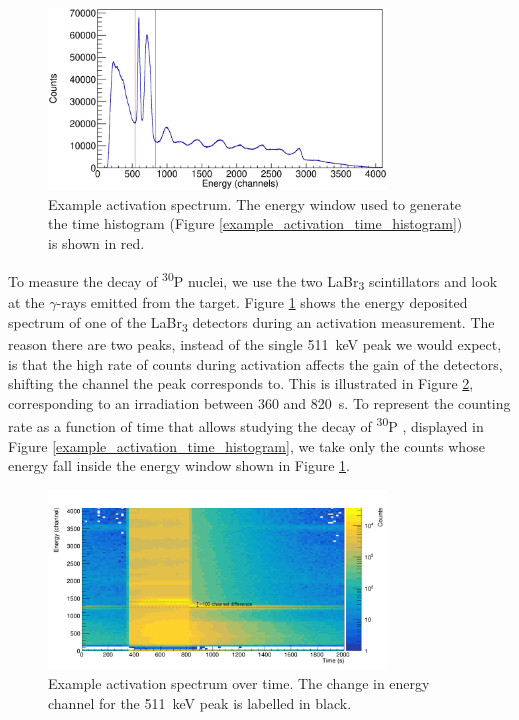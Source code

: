 \documentclass[a4paper,12pt]{report}
\newcommand{\Piso}{\textsuperscript{30}P }
\begin{document}
\begin{figure}[H]
	\centering
	\includegraphics[width=0.80\textwidth]{example_activation_energy_histogram.eps}
	\caption{Example activation spectrum.
	The energy window used to generate the time histogram (Figure \ref{example_activation_time_histogram}) is shown in red.}	%
	\label{example_activation_energy_histogram}
\end{figure}

To measure the decay of \Piso nuclei, we use the two LaBr\textsubscript{3} scintillators and look at the $\gamma$-rays emitted from the target.
Figure \ref{example_activation_energy_histogram} shows the energy deposited spectrum of one of the LaBr\textsubscript{3} detectors during an activation measurement.
The reason there are two peaks, instead of the single \qty{511}{\keV} peak we would expect, is that the high rate of counts during activation affects the gain of the detectors, shifting the channel the peak corresponds to.
This is illustrated in Figure \ref{example_activation_energytime}, corresponding to an irradiation between 360 and \qty{820}{\s}.
To represent the counting rate as a function of time that allows studying the decay of \Piso, displayed in Figure \ref{example_activation_time_histogram}, we take only the counts whose energy fall inside the energy window shown in Figure \ref{example_activation_energy_histogram}.

\begin{figure}[H]
	\centering
	\includegraphics[width=0.80\textwidth]{example_activation_energytime.png} %
	\caption{Example activation spectrum over time.	%
	The change in energy channel for the \qty{511}{\keV} peak is labelled in black.}
	\label{example_activation_energytime}
\end{figure}
\end{document}
